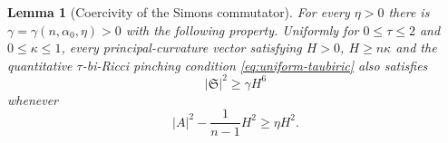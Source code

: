 \documentclass[11pt,reqno]{amsart}
\newtheorem{lemma}[proposition]{Lemma}
\theoremstyle{definition}
\theoremstyle{remark}
\numberwithin{equation}{section}
\begin{document}
\begin{lemma}[Coercivity of the Simons commutator]
\label{lem:simons-commutator-coercivity}
For every $\eta>0$ there is
$\gamma=\gamma(n,\alpha_0,\eta)>0$ with the following property.  Uniformly for
$0\leq\tau\leq2$ and $0\leq\kappa\leq1$, every principal-curvature vector satisfying
$H>0$, $H\geq n\kappa$ and the quantitative $\tau$-bi-Ricci pinching condition \eqref{eq:uniform-taubiric} also satisfies
\begin{equation*}
 |\mathfrak S|^2\geq\gamma H^6
\end{equation*}
whenever
\begin{equation}\label{eq:acylindrical-region}
 |A|^2-\frac1{n-1}H^2\geq\eta H^2.
\end{equation}
\end{lemma}
\end{document}
